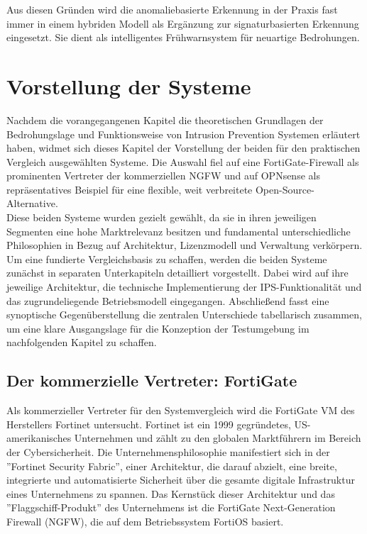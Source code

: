 Aus diesen Gründen wird die anomaliebasierte Erkennung in der Praxis fast immer in einem hybriden Modell als Ergänzung zur signaturbasierten Erkennung eingesetzt. Sie dient als intelligentes Frühwarnsystem für neuartige Bedrohungen.
\newpage
\section{Vorstellung der Systeme}
Nachdem die vorangegangenen Kapitel die theoretischen Grundlagen der Bedrohungslage und Funktionsweise von Intrusion Prevention Systemen erläutert haben, widmet sich dieses Kapitel der Vorstellung der beiden für den praktischen Vergleich ausgewählten Systeme. Die Auswahl fiel auf eine FortiGate-Firewall als prominenten Vertreter der kommerziellen NGFW und auf OPNsense als repräsentatives Beispiel für eine flexible, weit verbreitete Open-Source-Alternative.\\

Diese beiden Systeme wurden gezielt gewählt, da sie in ihren jeweiligen Segmenten eine hohe Marktrelevanz besitzen und fundamental unterschiedliche Philosophien in Bezug auf Architektur, Lizenzmodell und Verwaltung verkörpern. Um eine fundierte Vergleichsbasis zu schaffen, werden die beiden Systeme zunächst in separaten Unterkapiteln detailliert vorgestellt. Dabei wird auf ihre jeweilige Architektur, die technische Implementierung der IPS-Funktionalität und das zugrundeliegende Betriebsmodell eingegangen. Abschließend fasst eine synoptische Gegenüberstellung die zentralen Unterschiede tabellarisch zusammen, um eine klare Ausgangslage für die Konzeption der Testumgebung im nachfolgenden Kapitel zu schaffen.

\subsection{Der kommerzielle Vertreter: FortiGate}
Als kommerzieller Vertreter für den Systemvergleich wird die 
FortiGate VM des Herstellers Fortinet untersucht. Fortinet ist ein 1999 gegründetes, US-amerikanisches Unternehmen und zählt zu den globalen Marktführern im Bereich der Cybersicherheit. Die Unternehmensphilosophie manifestiert sich in der ''Fortinet Security Fabric'', einer Architektur, die darauf abzielt, eine breite, integrierte und automatisierte Sicherheit über die gesamte digitale Infrastruktur eines Unternehmens zu spannen. Das Kernstück dieser Architektur und das ''Flaggschiff-Produkt'' des Unternehmens ist die FortiGate Next-Generation Firewall (NGFW), die auf dem Betriebssystem FortiOS basiert. \\\\

